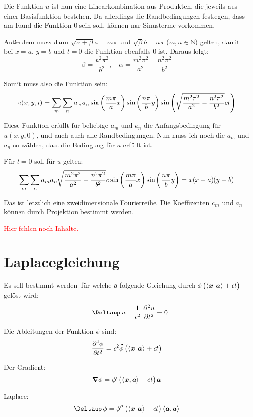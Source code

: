 \documentclass[11pt, ngerman, fleqn]{article}
\newcommand{\fehlt}{\textcolor{red}{Hier fehlen noch Inhalte.}}
\newcommand{\inner}[2]{\left\langle #1, #2 \right\rangle}
\newcommand{\laplace}{\mathop{{}\Deltaup}\nolimits}
\newcommand{\vnabla}{\vec \nabla}
\renewcommand{\vec}[1]{\boldsymbol{#1}}
\begin{document}
Die Funktion $u$ ist nun eine Linearkombination aus Produkten, die jeweils aus
einer Basisfunktion bestehen. Da allerdings die Randbedingungen festlegen, dass
am Rand die Funktion $0$ sein soll, können nur Sinusterme vorkommen.

Außerdem muss dann $\sqrt{\alpha + \beta} a = m \pi$ und $\sqrt{\beta} b = n \pi$ ($m,
n \in \mathbb N$) gelten, damit bei $x=a$, $y=b$ und $t=0$ die Funktion
ebenfalls $0$ ist. Daraus folgt:
\[
	\beta = \frac{n^2 \pi^2}{b^2}
	,\quad
	\alpha = \frac{m^2 \pi^2}{a^2} - \frac{n^2 \pi^2}{b^2}
\]

Somit muss also die Funktion sein:
\[
	u(x, y, t)
	= \sum_m \sum_n a_m a_n \sin\del{\frac{m\pi}a x}
	\sin\del{\frac{n\pi}b y}
	\sin\del{\sqrt{\frac{m^2\pi^2}{a^2} - \frac{n^2\pi^2}{b^2}} c t}
\]

Diese Funktion erfüllt für beliebige $a_m$ und $a_n$ die Anfangsbedingung
für $u(x, y, 0)$, und auch auch alle Randbedingungen. Nun muss ich noch die
$a_m$ und $a_n$ so wählen, dass die Bedingung für $\dot u$ erfüllt ist.

Für $t=0$ soll für $\dot u$ gelten:
\[
	\sum_m \sum_n a_m a_n \sqrt{\frac{m^2\pi^2}{a^2} - \frac{n^2\pi^2}{b^2}} c \sin\del{\frac{m\pi}a x}
	\sin\del{\frac{n\pi}b y}
	= x(x-a)(y-b)
\]

Das ist letztlich eine zweidimensionale Fourierreihe. Die Koeffizenten $a_m$ und $a_n$ können durch Projektion bestimmt werden.

\fehlt


\section{Laplacegleichung}
\label{2}

Es soll bestimmt werden, für welche $\vec a$ folgende Gleichung durch $\phi\del{\inner{\vec x}{\vec a} + ct}$ gelöst wird:
\[
	- \laplace u - \frac1{c^2} \dpd[2] ut = 0
\]

Die Ableitungen der Funktion $\phi$ sind:
\[
	\dpd[2]\phi t = c^2 \ddot \phi\del{\inner{\vec x}{\vec a} + ct}
\]

Der Gradient:
\[
	\vnabla \phi = \phi'\del{\inner{\vec x}{\vec a} + ct} \vec a
\]

Laplace:
\[
	\laplace \phi = \phi''\del{\inner{\vec x}{\vec a} + ct} \inner{\vec a}{\vec a}
\]
\end{document}
